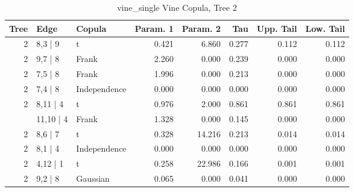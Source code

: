\begin{table}

\caption{vine_single Vine Copula, Tree 2}
\centering
\begin{tabular}[t]{rllrrrrr}
\toprule
Tree & Edge & Copula & Param. 1 & Param. 2 & Tau & Upp. Tail & Low. Tail\\
\midrule
2 & 8,3 | 9 & t & 0.421 & 6.860 & 0.277 & 0.112 & 0.112\\
2 & 9,7 | 8 & Frank & 2.260 & 0.000 & 0.239 & 0.000 & 0.000\\
2 & 7,5 | 8 & Frank & 1.996 & 0.000 & 0.213 & 0.000 & 0.000\\
2 & 7,4 | 8 & Independence & 0.000 & 0.000 & 0.000 & 0.000 & 0.000\\
2 & 8,11 | 4 & t & 0.976 & 2.000 & 0.861 & 0.861 & 0.861\\
\addlinespace
2 & 11,10 | 4 & Frank & 1.328 & 0.000 & 0.145 & 0.000 & 0.000\\
2 & 8,6 | 7 & t & 0.328 & 14.216 & 0.213 & 0.014 & 0.014\\
2 & 8,1 | 4 & Independence & 0.000 & 0.000 & 0.000 & 0.000 & 0.000\\
2 & 4,12 | 1 & t & 0.258 & 22.986 & 0.166 & 0.001 & 0.001\\
2 & 9,2 | 8 & Gaussian & 0.065 & 0.000 & 0.041 & 0.000 & 0.000\\
\bottomrule
\end{tabular}
\end{table}

